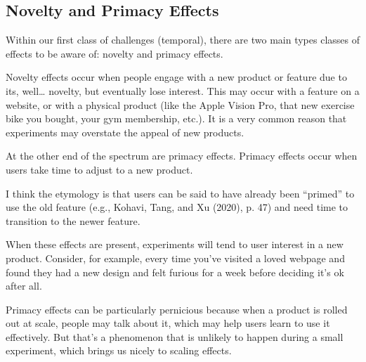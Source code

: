 \documentclass[letterpaper,10pt,english]{jupyterBook}
\begin{document}
\subsection{Novelty and Primacy Effects}
\label{\detokenize{30_questions/45_causal_questions_external:novelty-and-primacy-effects}}
\sphinxAtStartPar
Within our first class of challenges (temporal), there are two main types classes of effects to be aware of: novelty and primacy effects.

\sphinxAtStartPar
Novelty effects occur when people engage with a new product or feature due to its, well… novelty, but eventually lose interest. This may occur with a feature on a website, or with a physical product (like the Apple Vision Pro, that new exercise bike you bought, your gym membership, etc.). It is a very common reason that experiments may overstate the appeal of new products.

\sphinxAtStartPar
At the other end of the spectrum are primacy effects. Primacy effects occur when users take time to adjust to a new product.%
\begin{footnote}[1]\sphinxAtStartFootnote
I think the etymology is that users can be said to have already been “primed” to use the old feature (e.g., Kohavi, Tang, and Xu (2020), p. 47) and need time to transition to the newer feature.
%
\end{footnote} When these effects are present, experiments will tend to  user interest in a new product. Consider, for example, every time you’ve visited a loved webpage and found they had a new design and felt furious for a week before deciding it’s ok after all.

\sphinxAtStartPar
Primacy effects can be particularly pernicious because when a product is rolled out at scale, people may talk about it, which may help users learn to use it effectively. But that’s a phenomenon that is unlikely to happen during a small experiment, which brings us nicely to scaling effects.
\end{document}

